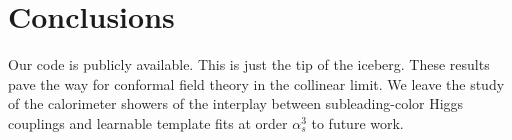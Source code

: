 \section{Conclusions}\label{sec:conclusions}

Our code is publicly available. This is just the tip of the iceberg.
These results pave the way for conformal field theory in the collinear
limit. We leave the study of the calorimeter showers of the interplay
between subleading-color Higgs couplings and learnable template fits at
order $\alpha_s^3$ to future work.

